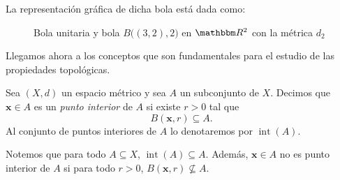 \newpage
La representación gráfica de dicha bola está dada como:
\begin{figure}[h!]
    \centering
    \caption{Bola unitaria y bola $B\big((3, 2), 2\big)$ en $\RR[2]$ con la métrica $d_2$}
\end{figure}

Llegamos ahora a los conceptos que son fundamentales para el estudio de las propiedades topológicas.

\begin{definicion}{}{}
    Sea $(X, d)$ un espacio métrico y sea $A$ un subconjunto de $X$. Decimos que $\mathbf{x} \in A$ es un \emph{punto interior} de $A$ si existe $r > 0$ tal que
    $$B(\mathbf{x}, r) \subseteq A.$$
    Al conjunto de puntos interiores de $A$ lo denotaremos por $\operatorname{int}(A)$.
\end{definicion}

Notemos que para todo $A \subseteq X$, $\operatorname{int} (A) \subseteq A$. Además, $\mathbf{x} \in A$ no es punto interior de $A$ si para todo $r > 0$, $B(\mathbf{x}, r) \nsubseteq A$.

